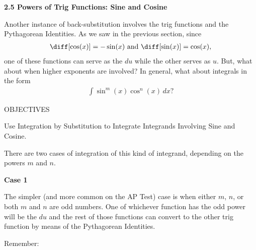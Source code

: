 \textbf{\large{2.5 Powers of Trig Functions: Sine and Cosine}} \par

Another instance of back-substitution involves the trig functions and the Pythagorean Identities. As we saw in the previous section, since \begin{align*}
    \diff [\cos (x)] = -\sin (x) \text{ and } \diff [\sin (x)] = \cos (x),
\end{align*}
one of these functions can serve as the $du$ while the other serves as $u$. But, what about when higher exponents are involved? In general, what about integrals in the form \begin{align*}
    \int \sin^m (x)\cos^n (x) \, dx?
\end{align*}

\begin{tcolorbox}[objective]
    \begin{center}
        OBJECTIVES \\[11pt]
    \end{center}
    Use Integration by Substitution to Integrate Integrands Involving Sine and Cosine.
\end{tcolorbox}

There are two cases of integration of this kind of integrand, depending on the powers $m$ and $n$. \par

\textbf{Case 1} \par

The simpler (and more common on the AP Test) case is when either $m$, $n$, or both $m$ and $n$ are odd numbers. One of whichever function has the odd power will be the $du$ and the rest of those functions can convert to the other trig function by means of the Pythagorean Identities. \par

Remember: \par


